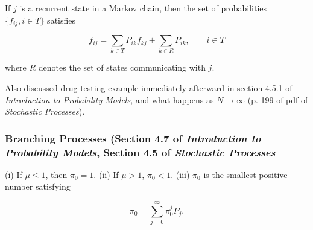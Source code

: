 \begin{proposition}If \(j\) is a recurrent state in a Markov chain, then the set of probabilities \(\{f_{ij}, i \in T\}\) satisfies

\[
f_{ij} = \sum_{k \in T} P_{ik} f_{kj} + \sum_{k \in R} P_{ik}, \qquad i \in T
\]

where \(R\) denotes the set of states communicating with \(j\).

\end{proposition}


\begin{example}\label{stoch.gamb.ruin}

Also discussed drug testing example immediately afterward in section 4.5.1 of \textit{Introduction to Probability Models}, and what happens as \(N \to \infty\) (p. 199 of pdf of \textit{Stochastic Processes}).
\end{example}

\subsubsection{Branching Processes (Section 4.7 of \textit{Introduction to Probability Models}, Section 4.5 of \textit{Stochastic Processes}}

\begin{proposition}\label{stoch.sp.4.5.1}
(i) If \(\mu \leq 1\), then \(\pi_0 = 1\). (ii) If \(\mu > 1\), \(\pi_0 < 1\). (iii) \(\pi_0\) is the smallest positive number satisfying 

\[
\pi_0 = \sum_{j =0}^\infty \pi_0^j P_j.
\]
\end{proposition}

